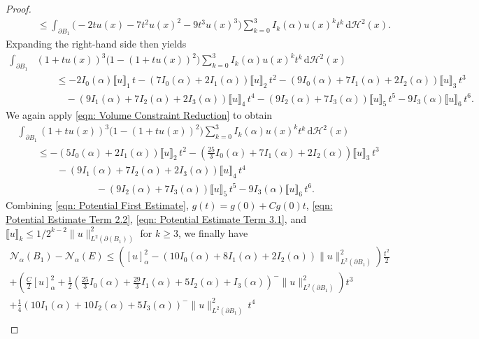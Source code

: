 \documentclass[a4paper,11pt,reqno]{amsart}
\numberwithin{equation}{section}
\theoremstyle{remark}
\theoremstyle{definition}
\newcommand{\lbr}{\llbracket}
\newcommand{\rbr}{\rrbracket}
\newcommand{\dd}{\,\mathrm{d}}
\newcommand{\nl}{\mathcal{N}_{\alpha}}
\renewcommand{\leq}{\leqslant}
\renewcommand{\geq}{\geqslant}
\begin{document}
\begin{proof}
\begin{align*}
						   &\qquad\leq \int_{\partial B_1}\big(-2tu(x)-7t^2u(x)^2-9t^3u(x)^3\big)\sum_{k=0}^3 I_k(\alpha)u(x)^kt^k\dd\mathcal{H}^2(x).
	\end{align*}
Expanding the right-hand side then yields
	\begin{align*}
		\int_{\partial B_1}&(1+tu(x))^3\big(1-(1+tu(x))^2\big)\sum_{k=0}^3 I_k(\alpha)u(x)^kt^k\dd\mathcal{H}^2(x)  \\
						   &\qquad\leq -2I_0(\alpha)\lbr u \rbr_1\,t -\left(7I_0(\alpha)+2I_1(\alpha)\right) \lbr u \rbr_2\,t^2-\left(9I_0(\alpha)+7I_1(\alpha)+2I_2(\alpha)\right) \lbr u \rbr_3\,t^3\\
						   &\qquad\quad  -\left(9I_1(\alpha)+7I_2(\alpha)+2I_3(\alpha)\right)\lbr u \rbr_4\,t^4 -\left(9I_2(\alpha)+7I_3(\alpha)\right)\lbr u \rbr_5\, t^5-9I_3(\alpha)\lbr u \rbr_6\, t^6.
	\end{align*}
We again apply \eqref{eqn: Volume Constraint Reduction} to obtain
	\begin{equation}\label{eqn: Potential Estimate Term 3.1}
		\begin{aligned}
			&\int_{\partial B_1}(1+tu(x))^3\big(1-(1+tu(x))^2\big)\sum_{k=0}^3 I_k(\alpha)u(x)^kt^k\dd\mathcal{H}^2(x)  \\
				&\qquad\leq  -\left(5I_0(\alpha)+2I_1(\alpha)\right) \lbr u \rbr_2\,t^2-\left(\frac{25}{3}I_0(\alpha)+7I_1(\alpha)+2I_2(\alpha)\right) \lbr u \rbr_3\,t^3\\
						   &\qquad\qquad  -\left(9I_1(\alpha)+7I_2(\alpha)+2I_3(\alpha)\right)\lbr u \rbr_4\,t^4 \\
						   &\qquad\qquad\qquad\qquad-\left(9I_2(\alpha)+7I_3(\alpha)\right)\lbr u \rbr_5\, t^5-9I_3(\alpha)\lbr u \rbr_6\, t^6.
		\end{aligned}
	\end{equation}
Combining \eqref{eqn: Potential First Estimate}, $g(t)=g(0)+Cg(0)t$, \eqref{eqn: Potential Estimate Term 2.2}, \eqref{eqn: Potential Estimate Term 3.1}, and $\lbr u\rbr_k \leq 1/2^{k-2}\|u\|_{L^2(\partial(B_1))}^2$ for $k\geq 3$, we finally have
	\begin{multline*}
		\nl(B_1)-\nl(E)\leq \left([u]_{\alpha}^2-\left(10I_0(\alpha)+8I_1(\alpha)+2I_2(\alpha)\right)\|u\|_{L^2(\partial B_1)}^2\right) \frac{t^2}{2} \\
		+\left(\frac{C}{2}[u]_{\alpha}^2+\frac{1}{2}\left(\frac{25}{3}I_0(\alpha)+\frac{29}{3}I_1(\alpha)+5I_2(\alpha)+I_3(\alpha)\right)^- \|u\|_{L^2(\partial B_1)}^2\right)t^3 \\
		+ \frac{1}{4}\left(10I_1(\alpha)+10I_2(\alpha)+5I_3(\alpha)\right)^-\|u\|_{L^2(\partial B_1)}^2\,t^4 \\

\end{multline*}
\end{proof}
\end{document}
